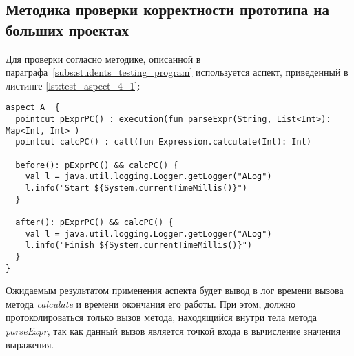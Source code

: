 \subsection{Методика проверки корректности прототипа на больших проектах}
\label{sub:students_programm_methodology}
Для проверки согласно методике, описанной в параграфа~\ref{subs:students_testing_program} используется аспект, приведенный в листинге \ref{lst:test_aspect_4_1}:
\begin{lstlisting}[style={java}, label={lst:test_aspect_4_1},
  caption={Пример тестового аспекта}]
aspect A  {
  pointcut pExprPC() : execution(fun parseExpr(String, List<Int>): Map<Int, Int> )
  pointcut calcPC() : call(fun Expression.calculate(Int): Int)

  before(): pExprPC() && calcPC() {
    val l = java.util.logging.Logger.getLogger("ALog")
    l.info("Start ${System.currentTimeMillis()}")
  }

  after(): pExprPC() && calcPC() {
    val l = java.util.logging.Logger.getLogger("ALog")
    l.info("Finish ${System.currentTimeMillis()}")
  }
}
\end{lstlisting}
Ожидаемым результатом применения аспекта будет вывод в лог времени вызова метода \textit{calculate} и времени окончания его работы.
При этом, должно протоколироваться только вызов метода, находящийся внутри тела метода \textit{parseExpr}, так как данный вызов является точкой входа в вычисление значения выражения.



